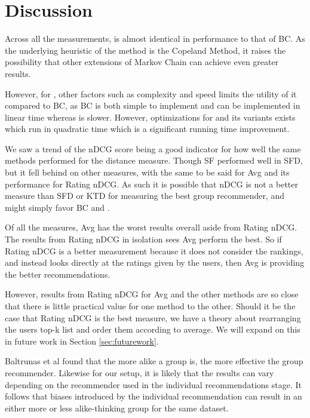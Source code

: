 \section{Discussion} \label{sec:discussion}
Across all the measurements, \MC is almost identical in performance to that of BC. As the underlying heuristic of the \MC method is the Copeland Method, it raises the possibility that other extensions of Markov Chain can achieve even greater results.

However, for \MC, other factors such as complexity and speed limits the utility of it compared to BC, as BC is both simple to implement and can be implemented in linear time whereas \MC is slower. However, optimizations for \MC and its variants exists which run in quadratic time which is a significant running time improvement\cite{rank:aggregation}.

We saw a trend of the nDCG score being a good indicator for how well the same methods performed for the distance measure. Though SF performed well in SFD, but it fell behind on other measures, with the same to be said for Avg and its performance for Rating nDCG. As such it is possible that nDCG is not a better measure than SFD or KTD for measuring the best group recommender, and might simply favor BC and \MC.

Of all the measures, Avg has the worst results overall aside from Rating nDCG. The results from Rating nDCG in isolation sees Avg perform the best. So if Rating nDCG is a better measurement because it does not consider the rankings, and instead looks directly at the ratings given by the users, then Avg is providing the better recommendations.

However, results from Rating nDCG for Avg and the other methods are so close that there is little practical value for one method to the other. Should it be the case that Rating nDCG is the best measure, we have a theory about rearranging the users top-k list and order them according to average. We will expand on this in future work in Section \ref{sec:futurework}.

Baltrunas et al found that the more alike a group is, the more effective the group recommender\cite{Baltrunas:2010:GRR:1864708.1864733}. Likewise for our setup, it is likely that the results can vary depending on the recommender used in the individual recommendations stage. It follows that biases introduced by the individual recommendation can result in an either more or less alike-thinking group for the same dataset.

